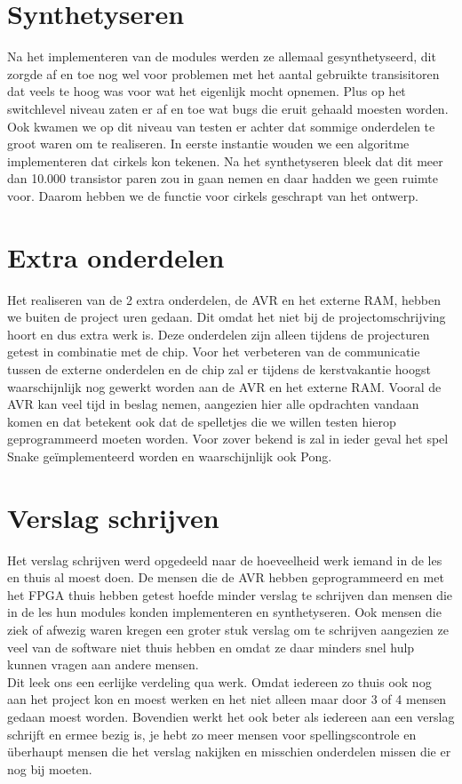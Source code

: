 \documentclass{scrartcl} %
\begin{document}
\section{Synthetyseren}

Na het implementeren van de modules werden ze allemaal gesynthetyseerd, dit zorgde af en toe nog wel voor problemen met het aantal gebruikte transisitoren dat veels te hoog was voor wat het eigenlijk mocht opnemen. Plus op het switchlevel niveau zaten er af en toe 
wat bugs die eruit gehaald moesten worden. Ook kwamen we op dit niveau van testen er achter dat sommige onderdelen te groot waren om te realiseren. In eerste instantie wouden we een algoritme implementeren dat cirkels kon tekenen. Na het synthetyseren bleek dat dit 
meer dan 10.000 transistor paren zou in gaan nemen en daar hadden we geen ruimte voor. Daarom hebben we de functie voor cirkels geschrapt van het ontwerp.


\section{Extra onderdelen}

Het realiseren van de 2 extra onderdelen, de AVR en het externe RAM, hebben we buiten de project uren gedaan. Dit omdat het niet bij de projectomschrijving hoort en dus extra werk is. Deze onderdelen zijn alleen tijdens de projecturen getest in combinatie met de chip. Voor het verbeteren van de communicatie tussen de externe onderdelen en de chip zal er tijdens de kerstvakantie hoogst waarschijnlijk nog gewerkt worden aan de AVR en het externe RAM. Vooral de AVR kan veel tijd in beslag nemen, aangezien hier alle opdrachten vandaan komen en dat betekent ook dat de spelletjes die we willen testen hierop geprogrammeerd moeten worden. Voor zover bekend is zal in ieder geval het spel Snake geïmplementeerd worden en waarschijnlijk ook Pong.

\section{Verslag schrijven}

Het verslag schrijven werd opgedeeld naar de hoeveelheid werk iemand in de les en thuis al moest doen. De mensen die de AVR hebben geprogrammeerd en met het FPGA thuis hebben getest hoefde minder verslag te schrijven dan mensen die in de les hun modules konden
implementeren en synthetyseren. Ook mensen die ziek of afwezig waren kregen een groter stuk verslag om te schrijven aangezien ze veel van de software niet thuis hebben en omdat ze daar minders snel hulp kunnen vragen aan andere mensen.\\
Dit leek ons een eerlijke verdeling qua werk. Omdat iedereen zo thuis ook nog aan het project kon en moest werken en het niet alleen maar door 3 of 4 mensen gedaan moest worden. Bovendien werkt het ook beter als iedereen aan een verslag schrijft en ermee bezig is, je hebt zo meer mensen voor spellingscontrole en überhaupt mensen die het verslag nakijken en misschien onderdelen missen die er nog bij moeten.
\end{document}
